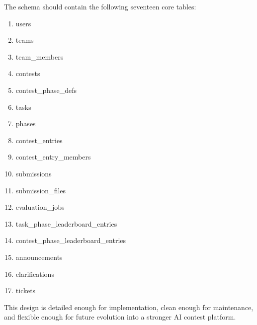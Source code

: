 \documentclass[11pt,a4paper]{article}
\begin{document}
The schema should contain the following seventeen core tables:
\begin{enumerate}
    \item users
    \item teams
    \item team\_members
    \item contests
    \item contest\_phase\_defs
    \item tasks
    \item phases
    \item contest\_entries
    \item contest\_entry\_members
    \item submissions
    \item submission\_files
    \item evaluation\_jobs
    \item task\_phase\_leaderboard\_entries
    \item contest\_phase\_leaderboard\_entries
    \item announcements
    \item clarifications
    \item tickets
\end{enumerate}

This design is detailed enough for implementation, clean enough for maintenance, and flexible enough for future evolution into a stronger AI contest platform.
\end{document}
